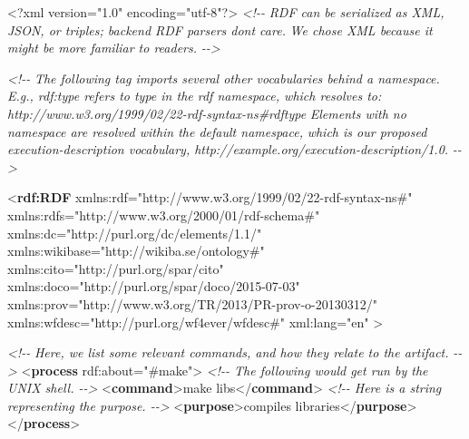 \documentclass[manuscript]{acmart}
\newenvironment{Shaded}{}{}
\newcommand{\CommentTok}[1]{\textcolor[rgb]{0.38,0.63,0.69}{\textit{#1}}}
\newcommand{\FunctionTok}[1]{\textcolor[rgb]{0.02,0.16,0.49}{#1}}
\newcommand{\KeywordTok}[1]{\textcolor[rgb]{0.00,0.44,0.13}{\textbf{#1}}}
\newcommand{\NormalTok}[1]{#1}
\newcommand{\OtherTok}[1]{\textcolor[rgb]{0.00,0.44,0.13}{#1}}
\newcommand{\StringTok}[1]{\textcolor[rgb]{0.25,0.44,0.63}{#1}}
\begin{document}
\begin{Shaded}
\begin{Highlighting}[]
\FunctionTok{\textless{}?xml}\OtherTok{ version=}\StringTok{"1.0"}\OtherTok{ encoding=}\StringTok{"utf{-}8"}\FunctionTok{?\textgreater{}}
\CommentTok{\textless{}!{-}{-}}
\CommentTok{RDF can be serialized as XML, JSON, or triples; backend RDF parsers don\textquotesingle{}t care.}
\CommentTok{We chose XML because it might be more familiar to readers.}
\CommentTok{{-}{-}\textgreater{}}

\CommentTok{\textless{}!{-}{-}}
\CommentTok{The following tag imports several other vocabularies behind a namespace.}
\CommentTok{E.g., \textasciigrave{}rdf:type\textasciigrave{} refers to \textasciigrave{}type\textasciigrave{} in the \textasciigrave{}rdf\textasciigrave{} namespace, which resolves to:}
\CommentTok{http://www.w3.org/1999/02/22{-}rdf{-}syntax{-}ns\#rdftype}
\CommentTok{Elements with no namespace are resolved within the default namespace,}
\CommentTok{which is our proposed execution{-}description vocabulary, http://example.org/execution{-}description/1.0.}
\CommentTok{{-}{-}\textgreater{}}

\NormalTok{\textless{}}\KeywordTok{rdf:RDF}\OtherTok{ xmlns:rdf=}\StringTok{"http://www.w3.org/1999/02/22{-}rdf{-}syntax{-}ns\#"}
\OtherTok{         xmlns:rdfs=}\StringTok{"http://www.w3.org/2000/01/rdf{-}schema\#"}
\OtherTok{         xmlns:dc=}\StringTok{"http://purl.org/dc/elements/1.1/"}
\OtherTok{         xmlns:wikibase=}\StringTok{"http://wikiba.se/ontology\#"}
\OtherTok{         xmlns:cito=}\StringTok{"http://purl.org/spar/cito"}
\OtherTok{         xmlns:doco=}\StringTok{"http://purl.org/spar/doco/2015{-}07{-}03"}
\OtherTok{         xmlns:prov=}\StringTok{"http://www.w3.org/TR/2013/PR{-}prov{-}o{-}20130312/"}
\OtherTok{         xmlns:wfdesc=}\StringTok{"http://purl.org/wf4ever/wfdesc\#"}
\OtherTok{         xml:lang=}\StringTok{"en"}
\NormalTok{         \textgreater{}}

  \CommentTok{\textless{}!{-}{-}}
\CommentTok{  Here, we list some relevant commands, and how they relate to the artifact.}
\CommentTok{  {-}{-}\textgreater{}}
\NormalTok{  \textless{}}\KeywordTok{process}\OtherTok{ rdf:about=}\StringTok{"\#make"}\NormalTok{\textgreater{}}
    \CommentTok{\textless{}!{-}{-} The following would get run by the UNIX shell. {-}{-}\textgreater{}}
\NormalTok{    \textless{}}\KeywordTok{command}\NormalTok{\textgreater{}make libs\textless{}/}\KeywordTok{command}\NormalTok{\textgreater{}}
    \CommentTok{\textless{}!{-}{-} Here is a string representing the purpose. {-}{-}\textgreater{}}
\NormalTok{    \textless{}}\KeywordTok{purpose}\NormalTok{\textgreater{}compiles libraries\textless{}/}\KeywordTok{purpose}\NormalTok{\textgreater{}}
\NormalTok{  \textless{}/}\KeywordTok{process}\NormalTok{\textgreater{}}


\end{Highlighting}
\end{Shaded}
\end{document}

